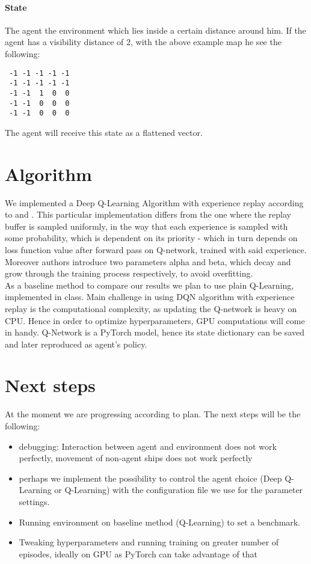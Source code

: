 \documentclass[11pt]{article} %
\begin{document}
\paragraph{State}
The agent  the environment which lies inside a certain distance around him. If the agent has a visibility distance of 2, with the above example map he see the following:
 \begin{verbatim}
 -1 -1 -1 -1 -1 
 -1 -1 -1 -1 -1 
 -1 -1  1  0  0 
 -1 -1  0  0  0  
 -1 -1  0  0  0 
\end{verbatim}
The agent will receive this state as a flattened vector.

\section{Algorithm}
We implemented a Deep Q-Learning Algorithm with experience replay according to \cite{schaul_2016} and \cite{crabe_2020}. This particular implementation differs from the one where the replay buffer is sampled uniformly, in the way that each experience is sampled with some probability, which is dependent on its priority - which in turn depends on loss function value after forward pass on Q-network, trained with said experience. Moreover authors introduce two parameters alpha and beta, which decay and grow through the training process respectively, to avoid overfitting. \\
As a baseline method to compare our results we plan to use plain Q-Learning, implemented in class. Main challenge in using DQN algorithm with experience replay is the computational complexity, as updating the Q-network is heavy on CPU. Hence in order to optimize hyperparameters, GPU computations will come in handy. Q-Network is a PyTorch model, hence its state dictionary can be saved and later reproduced as agent's policy.

\section{Next steps}
At the moment we are progressing according to plan. The next steps will be the following:
\begin{itemize}
	\item debugging: Interaction between agent and environment does not work perfectly, movement of non-agent ships does not work perfectly
	\item perhaps we implement the possibility to control the agent choice (Deep Q-Learning or Q-Learning) with the configuration file we use for the parameter settings.
	\item Running environment on baseline method (Q-Learning) to set a benchmark.
	\item Tweaking hyperparameters and running training on greater number of episodes, ideally on GPU as PyTorch can take advantage of that
\end{itemize}
\end{document}
